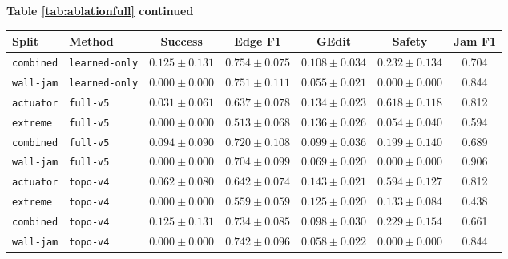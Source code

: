 \documentclass{article}
\begin{document}
\begin{center}
\textbf{Table \ref{tab:ablationfull} continued}\\[0.4ex]
\begin{tabular}{llccccc}
\toprule
Split & Method & Success & Edge F1 & GEdit & Safety & Jam F1 \\
\midrule
\texttt{combined} & \texttt{learned-only} & $0.125 \pm 0.131$ & $0.754 \pm 0.075$ & $0.108 \pm 0.034$ & $0.232 \pm 0.134$ & 0.704 \\
\texttt{wall-jam} & \texttt{learned-only} & $0.000 \pm 0.000$ & $0.751 \pm 0.111$ & $0.055 \pm 0.021$ & $0.000 \pm 0.000$ & 0.844 \\
\texttt{actuator} & \texttt{full-v5} & $0.031 \pm 0.061$ & $0.637 \pm 0.078$ & $0.134 \pm 0.023$ & $0.618 \pm 0.118$ & 0.812 \\
\texttt{extreme} & \texttt{full-v5} & $0.000 \pm 0.000$ & $0.513 \pm 0.068$ & $0.136 \pm 0.026$ & $0.054 \pm 0.040$ & 0.594 \\
\texttt{combined} & \texttt{full-v5} & $0.094 \pm 0.090$ & $0.720 \pm 0.108$ & $0.099 \pm 0.036$ & $0.199 \pm 0.140$ & 0.689 \\
\texttt{wall-jam} & \texttt{full-v5} & $0.000 \pm 0.000$ & $0.704 \pm 0.099$ & $0.069 \pm 0.020$ & $0.000 \pm 0.000$ & 0.906 \\
\texttt{actuator} & \texttt{topo-v4} & $0.062 \pm 0.080$ & $0.642 \pm 0.074$ & $0.143 \pm 0.021$ & $0.594 \pm 0.127$ & 0.812 \\
\texttt{extreme} & \texttt{topo-v4} & $0.000 \pm 0.000$ & $0.559 \pm 0.059$ & $0.125 \pm 0.020$ & $0.133 \pm 0.084$ & 0.438 \\
\texttt{combined} & \texttt{topo-v4} & $0.125 \pm 0.131$ & $0.734 \pm 0.085$ & $0.098 \pm 0.030$ & $0.229 \pm 0.154$ & 0.661 \\
\texttt{wall-jam} & \texttt{topo-v4} & $0.000 \pm 0.000$ & $0.742 \pm 0.096$ & $0.058 \pm 0.022$ & $0.000 \pm 0.000$ & 0.844 \\
\bottomrule
\end{tabular}
\end{center}
\normalsize
\end{document}
